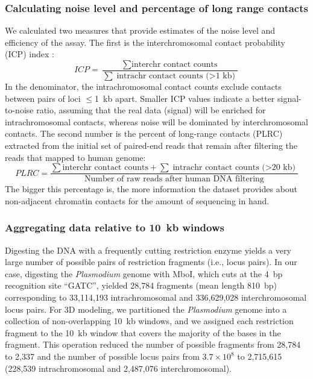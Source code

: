 \subsubsection{Calculating noise level and percentage of long range contacts}
\label{met:ICP}
We calculated two measures that provide estimates of the noise level and efficiency
of the assay. The first is the interchromosomal contact probability (ICP)
index \citep{kalhor:genome}:
\[
ICP=\frac{\sum{\text{interchr contact counts}}} {\sum{\text{intrachr contact counts ($>$1 kb)}}}
\]
In the denominator, the intrachromosomal contact counts exclude contacts between
pairs of loci $\le$1~kb apart. Smaller ICP values indicate a better signal-to-noise
ratio, assuming that the real data (signal) will be enriched for intrachromosomal
contacts, whereas noise will be dominated by interchromosomal contacts. The second
number is the percent of long-range contacts (PLRC) extracted from the initial set
of paired-end reads that remain after filtering the reads that mapped to human genome:
\[
PLRC=\frac{\sum{\text{interchr contact counts}} + \sum{\text{intrachr contact counts ($>$20 kb)}}} {\text{Number of raw reads after human DNA filtering}}
\]
The bigger this percentage is, the more information the dataset provides about
non-adjacent chromatin contacts for the amount of sequencing in hand.


\subsubsection{Aggregating data relative to 10~kb windows}
\label{met:10kb}
Digesting the DNA with a frequently cutting restriction enzyme yields a very large
number of possible pairs of restriction fragments (i.e., locus pairs). In our case,
digesting the {\em Plasmodium} genome with MboI, which cuts at the 4~bp recognition
site ``GATC'', yielded 28,784 fragments (mean length 810~bp) corresponding to
33,114,193 intrachromosomal and 336,629,028 interchromosomal locus pairs. For 3D
modeling, we partitioned the {\em Plasmodium} genome into a collection of
non-overlapping 10~kb windows, and we assigned each restriction fragment to the
10~kb window that covers the majority of the bases in the fragment. This operation
reduced the number of possible fragments from 28,784 to 2,337 and the number of
possible locus pairs from $3.7 \times 10^8$ to 2,715,615 (228,539 intrachromosomal
and 2,487,076 interchromosomal).

